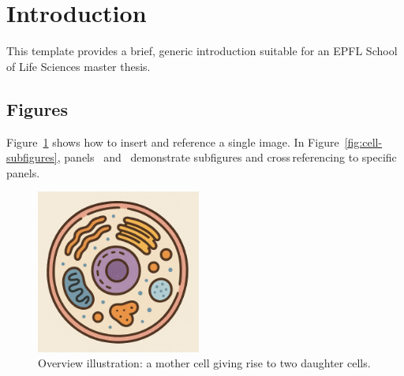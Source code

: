 \section{Introduction}

\noindent This template provides a brief, generic introduction suitable for an EPFL School of Life Sciences master thesis.

\subsection{Figures}

\noindent Figure~\ref{fig:cell-overview} shows how to insert and reference a single image. In Figure~\ref{fig:cell-subfigures}, panels~ and~ demonstrate subfigures and cross\,referencing to specific panels.

\begin{figure}[h]
  \centering
  \includegraphics[width=0.48\textwidth]{figures/cell.png}
  \caption{Overview illustration: a mother cell giving rise to two daughter cells.}
  \label{fig:cell-overview}
\end{figure}

